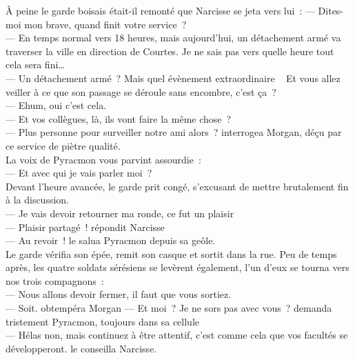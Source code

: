 \documentclass[french, a4paper, 12pt]{article}
\begin{document}
À peine le garde boisais était-il remonté que Narcisse se jeta vers lui~:
--- Dites-moi mon brave, quand finit votre service~?\\
--- En temps normal vers 18 heures, mais aujourd'hui, un détachement armé va traverser la ville en direction de Courtes. Je ne sais pas vers quelle heure tout cela sera fini…\\
--- Un détachement armé~? Mais quel évènement extraordinaire ~ Et vous allez veiller à ce que son passage se déroule sans encombre, c'est ça~?\\
--- Ehum, oui c'est cela.\\
--- Et vos collègues, là, ils vont faire la même chose~?\\
--- Plus personne pour surveiller notre ami alors~? interrogea Morgan, déçu par ce service de piètre qualité.\\
La voix de Pyracmon vous parvint assourdie~:\\
--- Et avec qui je vais parler moi~?\\

Devant l'heure avancée, le garde prit congé, s'excusant de mettre brutalement fin à la discussion.\\
--- Je vais devoir retourner ma ronde, ce fut un plaisir\\
--- Plaisir partagé~! répondit Narcisse\\
--- Au revoir~! le salua Pyracmon depuis sa geôle.\\
Le garde vérifia son épée, remit son casque et sortit dans la rue. Peu de temps après, les quatre soldats sérésiens se levèrent également, l'un d'eux se tourna vers nos trois compagnons~:\\
--- Nous allons devoir fermer, il faut que vous sortiez.\\
--- Soit. obtempéra Morgan
--- Et moi~? Je ne sors pas avec vous~? demanda tristement Pyracmon, toujours dans sa cellule\\
--- Hélas non, mais continuez à être attentif, c'est comme cela que vos facultés se développeront. le conseilla Narcisse.\\
\end{document}
